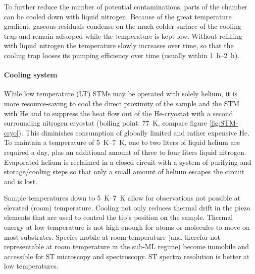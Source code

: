 To further reduce the number of potential contaminations, parts of the chamber can be cooled down with liquid nitrogen. Because of the great temperature gradient, gaseous residuals condense on the much colder surface of the cooling trap and remain adsorped while the temperature is kept low. Without refilling with liquid nitrogen the temperature slowly increases over time, so that the cooling trap looses its pumping efficiency over time (usually within \SIrange{1}{2}{\hour}).

\paragraph{Cooling system} 
While low temperature (LT) STMs may be operated with solely helium, it is more resource-saving to cool the direct proximity of the sample and the STM with He and to suppress the heat flow out of the He-cryostat with a second surrounding nitrogen cryostat (boiling point: \SI{77}{\K}, compare figure \ref{fig:STM-cryo}). This diminishes consumption of globally limited and rather expensive He. To maintain a temperature of \SIrange{5}{7}{\K}, one to two liters of liquid helium are required a day, plus an additional amount of three to four liters liquid nitrogen. Evaporated helium is reclaimed in a closed circuit with a system of purifying and storage/cooling steps so that only a small amount of helium escapes the circuit and is lost.

Sample temperatures down to \SIrange{5}{7}{\K} allow for observations not possible at elevated (room) temperature. Cooling not only reduces thermal drift in the piezo elements that are used to control the tip's position on the sample. Thermal energy at low temperature is not high enough for atoms or molecules to move on most substrates. Species mobile at room temperature (and therefor not representable at room temperature in the sub-ML regime) become immobile and accessible for ST microscopy and spectroscopy. ST spectra resolution is better at low temperatures.

